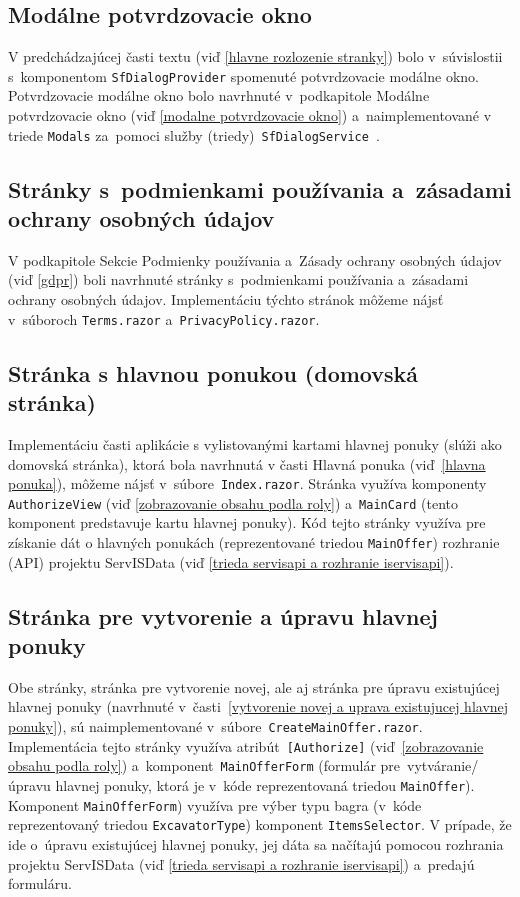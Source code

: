 \subsection{Modálne potvrdzovacie okno}
\label{modalne potvrdzovacie okno2}

V predchádzajúcej časti textu (viď \ref{hlavne rozlozenie stranky}) bolo v~súvislostii s~komponentom \verb|SfDialogProvider| spomenuté potvrdzovacie modálne okno. Potvrdzovacie modálne okno bolo navrhnuté v~podkapitole Modálne potvrdzovacie okno (viď \ref{modalne potvrdzovacie okno}) a~naimplementované v triede \verb|Modals| za~pomoci služby (triedy)~\texttt{SfDialogService}~\cite{sfdialogservice}.

\subsection{Stránky s~podmienkami používania a~zásadami ochrany osobných údajov}

V podkapitole Sekcie Podmienky používania a~Zásady ochrany osobných údajov (viď \ref{gdpr}) boli navrhnuté stránky s~podmienkami používania a~zásadami ochrany osobných údajov. Implementáciu týchto stránok môžeme nájsť v~súboroch \verb|Terms.razor| a~\verb|PrivacyPolicy.razor|.

\subsection{Stránka s hlavnou ponukou (domovská stránka)}

Implementáciu časti aplikácie s vylistovanými kartami hlavnej ponuky (slúži ako domovská stránka), ktorá bola navrhnutá v časti Hlavná ponuka (viď~\ref{hlavna ponuka}), môžeme nájsť v~súbore~\verb|Index.razor|. Stránka využíva komponenty \verb|AuthorizeView| (viď \ref{zobrazovanie obsahu podla roly}) a~\verb|MainCard| (tento komponent predstavuje kartu hlavnej ponuky). Kód tejto stránky využíva pre získanie dát o hlavných ponukách (reprezentované triedou \verb|MainOffer|) rozhranie (API) projektu ServISData (viď \ref{trieda servisapi a rozhranie iservisapi}).

\subsection{Stránka pre vytvorenie a úpravu hlavnej ponuky}

Obe stránky, stránka pre vytvorenie novej, ale aj stránka pre úpravu existujúcej hlavnej ponuky (navrhnuté v~časti~\ref{vytvorenie novej a uprava existujucej hlavnej ponuky}), sú naimplementované v~súbore~\verb|CreateMainOffer.razor|. Implementácia tejto stránky využíva atribút~\verb|[Authorize]| (viď~\ref{zobrazovanie obsahu podla roly}) a~komponent~\verb|MainOfferForm| (formulár pre~vytváranie/úpravu hlavnej ponuky, ktorá je v~kóde reprezentovaná triedou \verb|MainOffer|). Komponent \verb|MainOfferForm|) využíva pre výber typu bagra (v~kóde reprezentovaný triedou \verb|ExcavatorType|) komponent \verb|ItemsSelector|. V prípade, že ide o~úpravu existujúcej hlavnej ponuky, jej dáta sa načítajú pomocou rozhrania projektu ServISData (viď \ref{trieda servisapi a rozhranie iservisapi}) a~predajú formuláru.

